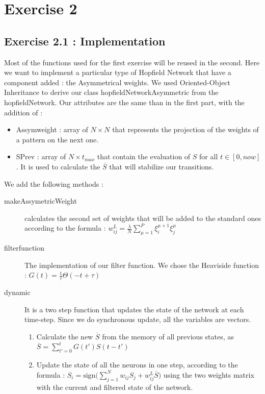 \section{Exercise 2}

\subsection{Exercise 2.1 : Implementation}
Most of the functions used for the first exercise will be reused in the second. Here we want to 
implement a particular type of Hopfield Network that have a component added : the Asymmetrical 
weights. We used Oriented-Object Inheritance to derive our class hopfieldNetworkAsymmetric
from the hopfieldNetwork. Our attributes are the same than in the first part, with the addition
of :
\begin{itemize}
\item Assymweight : array of $N\times N$ that represents the projection of the weights of a 
pattern on the next one.
\item SPrev : array of $N \times t_{max}$ that contain the evaluation of $S$ for all $t \in
 [0, now]$. It is used to calculate the $\overline{S}$ that will stabilize our transitions.
\end{itemize}

We add the following methods :
\begin{description}
\item [makeAssymetricWeight] calculates the second set of weights that will be added to the standard ones according to the formula : 
$w_{ij}^L = \frac{\lambda}{N}\sum_{\mu=1}^P \xi_i^{\mu+1} \xi_j^{\mu}$
\item [filterfunction] The implementation of our filter function. We chose the Heaviside function : $G(t) = \frac{1}{\tau} \Theta (-t + \tau)$
\item[dynamic] It is a two step function that updates the state of the network at each time-step. Since we do synchronous update, all the variables are vectors.
\begin{enumerate}
    \item Calculate the new  $\overline{S}$ from the memory of all previous states, as $\overline{S} = \sum_{t'=0}^{t} G(t')S(t-t')$
    \item Update the state of all the neurons in one step, 
according to the formula : $S_i = \textrm{sign}\big(\sum_{j=1}^N w_{ij}S_j + w_{ij}^L\overline{S} \big)$ using the
two weights matrix with the current and filtered state of the network. 
\end{enumerate}  
\end{description}


